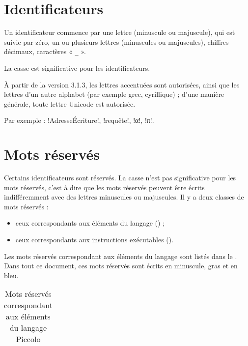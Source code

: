 \section{Identificateurs}
Un identificateur commence par une lettre (minuscule ou majuscule), qui est suivie par zéro, un ou plusieurs lettres (minuscules ou majuscules), chiffres décimaux, caractères « \texttt{\_} ».

La casse est significative pour les identificateurs.

À partir de la version 3.1.3, les lettres accentuées sont autorisées, ainsi que les lettres d'un autre alphabet (par exemple grec, cyrillique) ; d'une manière générale, toute lettre Unicode est autorisée.

Par exemple : \pic!AdresseÉcriture!, \pic!requête!, \pic!α!, \pic!π!.

\section{Mots réservés}

Certains identificateurs sont réservés. La casse n’est pas significative pour les mots réservés, c’est à dire que les mots réservés peuvent être écrits indifféremment avec des lettres minuscules ou majuscules. Il y a deux classes de mots réservés :
\begin{itemize}
  \item ceux correspondants aux éléments du langage () ;
  \item ceux correspondants aux instructions exécutables ().
\end{itemize}


Les mots réservés correspondant aux éléments du langage sont listés dans le . Dans tout ce document, ces mots réservés sont écrits en minuscule, gras et en bleu.


\begin{table}[!t]
  \centering
  \begin{tabular}{llllll}
    
  \end{tabular}
  \caption{Mots réservés correspondant aux éléments du langage Piccolo}
  \ligne
\end{table}






